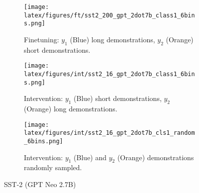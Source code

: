 \begin{figure*}[t!]
    \centering
    \begin{minipage}[t]{\linewidth}
        \begin{subfigure}{0.31\linewidth}
            \centering
            \texttt{[image: latex/figures/ft/sst2\_200\_gpt\_2dot7b\_class1\_6bins.png]}
            \caption{Finetuning: $y_1$ (Blue) long demonstrations, $y_2$ (Orange) short demonstrations.}
        \end{subfigure}%
        \hfill
        \begin{subfigure}{0.31\linewidth}
            \centering
            \texttt{[image: latex/figures/int/sst2\_16\_gpt\_2dot7b\_class1\_6bins.png]}
            \caption{Intervention: $y_1$ (Blue) short demonstrations, $y_2$ (Orange) long demonstrations.}
        \end{subfigure}
        \hfill
        \begin{subfigure}{0.31\linewidth}
            \centering
            \texttt{[image: latex/figures/int/sst2\_16\_gpt\_2dot7b\_cls1\_random\_6bins.png]}
            \caption{Intervention: $y_1$ (Blue) and $y_2$ (Orange) demonstrations randomly sampled.}
        \end{subfigure}
    \end{minipage}%
    \hfill
    \begin{minipage}[c]{\linewidth}
        \caption{SST-2 (GPT Neo 2.7B)}
    \end{minipage}
\end{figure*}